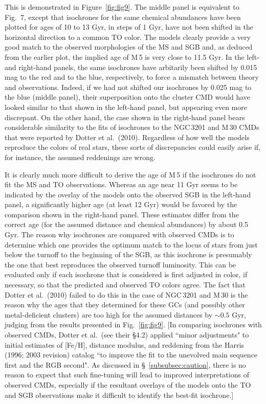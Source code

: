 \documentclass[12pt,preprint]{aastex}
\begin{document}
This is demonstrated in Figure~\ref{fig:fig9}.  The middle panel is equivalent
to Fig.~7, except that isochrones for the same chemical abundances have been
plotted for ages of 10 to 13 Gyr, in steps of 1 Gyr, have not been shifted in
the horizontal direction to a common TO color.  The models clearly provide
a very good match to the observed morphologies of the MS and SGB and, as deduced
from the earlier plot, the implied age of M$\,$5 is very close to 11.5 Gyr.  In
the left- and right-hand panels, the same isochrones have arbitarily been 
shifted by 0.015 mag to the red and to the blue, respectively, to force a 
mismatch between theory and observations.  Indeed, if we had not shifted our
isochrones by 0.025 mag to the blue (middle panel), their superposition onto 
the cluster CMD would have looked similar to that shown in the left-hand panel,
but appearing even more discrepant.  On the other hand, the case shown in the
right-hand panel bears considerable similarity to the fits of isochrones to the
NGC$\,$3201 and M$\,$30 CMDs that were reported by Dotter et al.~(2010).
Regardless of how well the models reproduce the colors of real stars, these
sorts of discrepancies could easily arise if, for instance, the assumed
reddenings are wrong.

It is clearly much more difficult to derive the age of M$\,$5 if the isochrones
do not fit the MS and TO observations.  Whereas an age near 11 Gyr seems to be
indicated by the overlay of the models onto the observed SGB in the left-hand
panel, a significantly higher age (at least 12 Gyr) would be favored by the
comparison shown in the right-hand panel.  These estimates differ from the
correct age (for the assumed distance and chemical abundances) by about 0.5 Gyr.
The reason why isochrones are compared with observed CMDs is to determine which
one provides the optimum match to the locus of stars from just below the
turnoff to the beginning of the SGB, as this isochrone is presumably the one
that best reproduces the observed turnoff luminosity.  This can be evaluated
only if each isochrone that is considered is first adjusted in color, if
necessary, so that the predicted and observed TO colors agree.  The fact that
Dotter et al.~(2010) failed to do this in the case of NGC$\,$3201 and
M$\,$30 is the reason why the ages that they determined for these GCs
(and possibly other metal-deficient clusters) are too high for the assumed
distances by $\sim 0.5$ Gyr, judging from the results presented in
Fig.~\ref{fig:fig9}.  [In comparing isochrones with observed CMDs, Dotter et
al.~(see their \S 4.2) applied ``minor adjustments" to initial estimates of
[Fe/H], distance modulus, and reddening from the Harris (1996; 2003 revision)
catalog ``to improve the fit to the unevolved main sequence first and the RGB
second".  As discussed in \S~\ref{subsubsec:caution}, there is no reason to
expect that such fine-tuning will lead to improved interpretations of observed
CMDs, especially if the resultant overlays of the models onto the TO and SGB
observations make it difficult to identify the best-fit isochrone.]  
\end{document}
